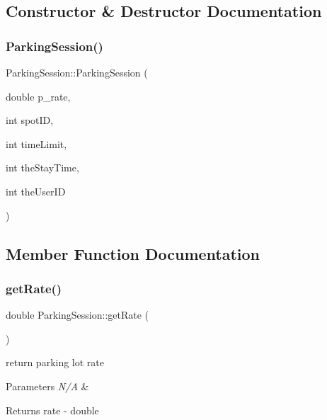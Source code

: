 \subsection{Constructor \& Destructor Documentation}
\mbox{\label{class_parking_session_ac6fa4013a0d22e2787f3751010097c70}} 
\subsubsection{\texorpdfstring{Parking\+Session()}{ParkingSession()}}
{\footnotesize\ttfamily Parking\+Session\+::\+Parking\+Session (\begin{DoxyParamCaption}\item[{double}]{p\+\_\+rate,  }\item[{int}]{spot\+ID,  }\item[{int}]{time\+Limit,  }\item[{int}]{the\+Stay\+Time,  }\item[{int}]{the\+User\+ID }\end{DoxyParamCaption})}



\subsection{Member Function Documentation}
\mbox{\label{class_parking_session_a025280eba2d68bfa085dcedf249d46dc}} 
\subsubsection{\texorpdfstring{get\+Rate()}{getRate()}}
{\footnotesize\ttfamily double Parking\+Session\+::get\+Rate (\begin{DoxyParamCaption}{ }\end{DoxyParamCaption})}



return parking lot rate 


\begin{DoxyParams}{Parameters}
{\em N/A} & \\
\hline
\end{DoxyParams}
\begin{DoxyReturn}{Returns}
rate -\/ double 
\end{DoxyReturn}
\mbox{\label{class_parking_session_ae3627399e8a72370561156dd0d79431d}} 
